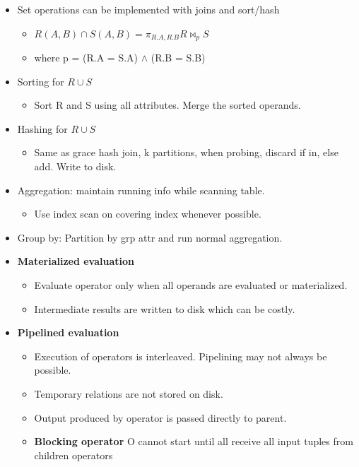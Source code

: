 \documentclass[8pt, landscape]{extarticle}
\begin{document}
\begin{multicols*}{4}
  \begin{itemize}
    \item Set operations can be implemented with joins and sort/hash
    \begin{itemize}
      \item $R(A, B) \cap S(A, B) = \pi_{R.A, R.B} R \bowtie_{p} S$
      \item where p = (R.A = S.A) $\wedge$ (R.B = S.B)
    \end{itemize}
    \item Sorting for $R \cup S$
    \begin{itemize}
      \item Sort R and S using all attributes. Merge the sorted operands.
    \end{itemize}
    \item Hashing for $R \cup S$
    \begin{itemize}
      \item Same as grace hash join, k partitions, when probing, discard if in, else add. Write to disk.
    \end{itemize}
    \item Aggregation: maintain running info while scanning table.
    \begin{itemize}
      \item Use index scan on covering index whenever possible.
    \end{itemize}
    \item Group by: Partition by grp attr and run normal aggregation.
    \item \textbf{Materialized evaluation}
    \begin{itemize}
      \item Evaluate operator only when all operands are evaluated or materialized.
      \item Intermediate results are written to disk which can be costly.
    \end{itemize}
    \item \textbf{Pipelined evaluation}
    \begin{itemize}
      \item Execution of operators is interleaved. Pipelining may not always be possible. 
      \item Temporary relations are not stored on disk.
      \item Output produced by operator is passed directly to parent.
      \item \textbf{Blocking operator} O cannot start until all receive all input tuples from children operators

\end{itemize}
\end{itemize}
\end{multicols*}
\end{document}
